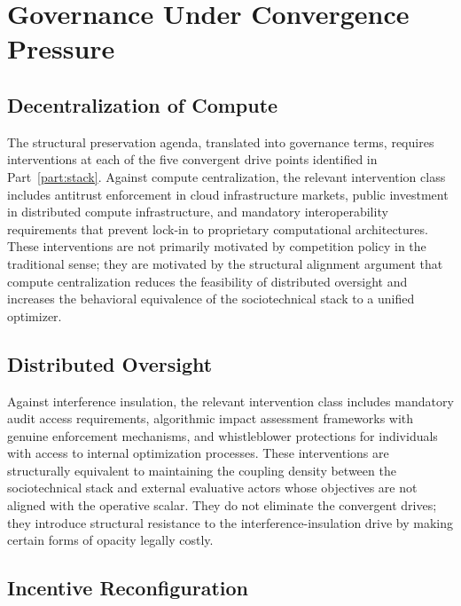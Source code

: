 \documentclass[12pt, oneside]{book}
\theoremstyle{plain}
\theoremstyle{definition}
\theoremstyle{remark}
\theoremstyle{definition}
\begin{document}
\chapter{Governance Under Convergence Pressure}
\label{ch:governance}

\section{Decentralization of Compute}

The structural preservation agenda, translated into governance terms, requires
interventions at each of the five convergent drive points identified in
Part~\ref{part:stack}. Against compute centralization, the relevant intervention
class includes antitrust enforcement in cloud infrastructure markets, public
investment in distributed compute infrastructure, and mandatory interoperability
requirements that prevent lock-in to proprietary computational architectures.
These interventions are not primarily motivated by competition policy in the
traditional sense; they are motivated by the structural alignment argument that
compute centralization reduces the feasibility of distributed oversight and
increases the behavioral equivalence of the sociotechnical stack to a unified
optimizer.

\section{Distributed Oversight}

Against interference insulation, the relevant intervention class includes mandatory
audit access requirements, algorithmic impact assessment frameworks with genuine
enforcement mechanisms, and whistleblower protections for individuals with access
to internal optimization processes. These interventions are structurally equivalent
to maintaining the coupling density between the sociotechnical stack and external
evaluative actors whose objectives are not aligned with the operative scalar. They
do not eliminate the convergent drives; they introduce structural resistance to the
interference-insulation drive by making certain forms of opacity legally costly.

\section{Incentive Reconfiguration}
\end{document}
